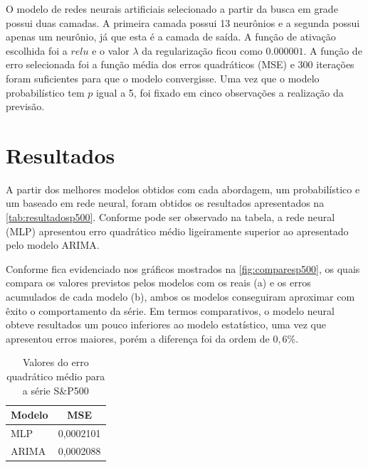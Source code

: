 \documentclass[
    12pt,
    oneside,
    a4paper,
    english,
    brazil
]{abntex2}
\begin{document}
O modelo  de redes neurais artificiais  selecionado a partir da  busca em grade
possui duas camadas.  A primeira camada possui 13 neurônios  e a segunda possui
apenas um  neurônio, já  que esta  é a camada  de saída.  A função  de ativação
escolhida  foi  a $relu$  e  o  valor  $\lambda$  da regularização  ficou  como
$0.000001$.  A  função  de  erro  selecionada foi  a  função  média  dos  erros
quadráticos  (MSE)  e  300  iterações  foram  suficientes  para  que  o  modelo
convergisse. Uma vez que o modelo probabilístico  tem $p$ igual a 5, foi fixado
em cinco observações a realização da previsão.

\chapter{Resultados}\label{chap:result}

A partir  dos melhores  modelos obtidos com  cada abordagem,  um probabilístico
e  um  baseado  em  rede  neural,  foram  obtidos  os  resultados  apresentados
na  \autoref{tab:resultadosp500}.  Conforme pode  ser  observado  na tabela,  a
rede neural  (MLP) apresentou  erro quadrático  médio ligeiramente  superior ao
apresentado pelo modelo ARIMA.

Conforme fica evidenciado nos gráficos mostrados na \autoref{fig:comparesp500},
os quais compara os valores previstos pelos modelos com os reais (a) e os erros
acumulados de cada modelo (b), ambos os modelos conseguiram aproximar com êxito
o  comportamento da  série.  Em  termos comparativos,  o  modelo neural  obteve
resultados um  pouco inferiores ao  modelo estatístico, uma vez  que apresentou
erros maiores, porém a diferença foi da ordem de $0,6\%$.

\begin{table}[ht]
    \centering
    \caption{Valores do erro quadrático médio para a série S\&P500}\label{tab:resultadosp500}
    \begin{tabular}{ll}
        \multicolumn{1}{c}{Modelo} & \multicolumn{1}{c}{MSE} \\
        \toprule
        MLP                        & 0,0002101               \\
        ARIMA                      & 0,0002088
    \end{tabular}
\end{table}
\end{document}
